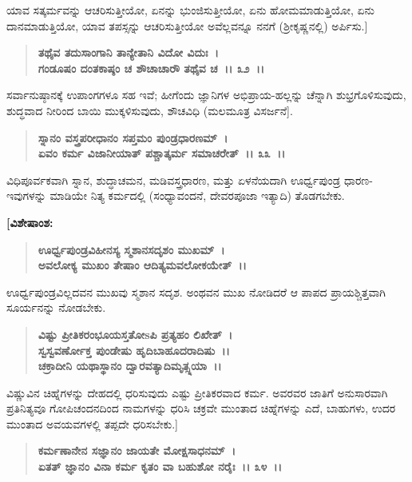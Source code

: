 ಯಾವ ಸತ್ಕರ್ಮವನ್ನು ಆಚರಿಸುತ್ತೀಯೋ, ಏನನ್ನು ಭುಂಜಿಸುತ್ತೀಯೋ, ಏನು ಹೋಮಮಾಡುತ್ತಿಯೋ, ಏನು ದಾನಮಾಡುತ್ತಿಯೋ, ಯಾವ ತಪಸ್ಸನ್ನು ಆಚರಿಸುತ್ತೀಯೋ ಅವೆಲ್ಲವನ್ನೂ ನನಗೆ (ಶ‍್ರೀಕೃಷ್ಣನಲ್ಲಿ) ಅರ್ಪಿಸು.]

\begin{verse}
\textbf{ತಥೈವ ತದುಸಾಂಗಾನಿ ತಾನ್ಯೇತಾನಿ ವಿದೋ ವಿದುಃ~।}\\\textbf{ಗಂಡೂಷಂ ದಂತಕಾಷ್ಠಂ ಚ ಶೌಚಾಚಾರೌ ತಥೈವ ಚ~।। ೩೨~।।}
\end{verse}

ಸರ್ವಾನುಷ್ಠಾನಕ್ಕೆ ಉಪಾಂಗಗಳೂ ಸಹ ಇವೆ; ಹೀಗೆಂದು ಜ್ಞಾನಿಗಳ ಅಭಿಪ್ರಾಯ-\-ಹಲ್ಲನ್ನು ಚೆನ್ನಾಗಿ ಶುಭ್ರಗೊಳಿಸುವುದು, ಶುದ್ಧವಾದ ನೀರಿಂದ ಬಾಯಿ ಮುಕ್ಕಳಿಸುವುದು, ಶೌಚವಿಧಿ (ಮಲಮೂತ್ರ ವಿಸರ್ಜನೆ].

\begin{verse}
\textbf{ಸ್ನಾನಂ ವಸ್ತ್ರಪರೀಧಾನಂ ಸಪ್ತಮಂ ಪುಂಡ್ರಧಾರಣಮ್~।}\\\textbf{ಏವಂ ಕರ್ಮ ವಿಜಾನೀಯಾತ್ ಪಶ್ಚಾತ್ಕರ್ಮ ಸಮಾಚರೇತ್~।। ೩೩~।।}
\end{verse}

ವಿಧಿಪೂರ್ವಕವಾಗಿ ಸ್ನಾನ, ಶುದ್ಧಾಚಮನ, ಮಡಿವಸ್ತ್ರಧಾರಣ, ಮತ್ತು ಏಳನೆಯದಾಗಿ ಊರ್ಧ್ವಪುಂಡ್ರ ಧಾರಣ-ಇವುಗಳನ್ನು ಮಾಡಿಯೇ ನಿತ್ಯ ಕರ್ಮದಲ್ಲಿ (ಸಂಧ್ಯಾವಂದನೆ, ದೇವರ\-ಪೂಜಾ ಇತ್ಯಾದಿ) ತೊಡಗಬೇಕು.

\begin{flushleft}
\textbf{[ವಿಶೇಷಾಂಶ:}
\end{flushleft}

\begin{verse}
\textbf{ಊರ್ಧ್ವಪುಂಡ್ರವಿಹೀನಸ್ಯ ಸ್ಮಶಾನಸದೃಶಂ ಮುಖಮ್~।}\\\textbf{ಅವಲೋಕ್ಯ ಮುಖಂ ತೇಷಾಂ ಆದಿತ್ಯಮವಲೋಕಯೇತ್~।।}
\end{verse}

ಊರ್ಧ್ವಪುಂಡ್ರವಿಲ್ಲದವನ ಮುಖವು ಸ್ಮಶಾನ ಸದೃಶ. ಅಂಥವನ ಮುಖ ನೋಡಿದರೆ ಆ ಪಾಪದ ಪ್ರಾಯಶ್ಚಿತ್ತವಾಗಿ ಸೂರ್ಯನನ್ನು ನೋಡಬೇಕು.

\begin{verse}
\textbf{ವಿಷ್ಟು ಪ್ರೀತಿಕರಂಭೂಯಸ್ತತೋsಪಿ ಪ್ರತ್ಯಹಂ ಲಿಖೇತ್~।}\\\textbf{ಸ್ವಸ್ವವರ್ಣೋಕ್ತ ಪುಂಡೇಷು ಹೃದಿಬಾಹೂದರಾದಿಷು~।। }\\\textbf{ಚಕ್ರಾದೀನಿ ಯಥಾಸ್ಥಾನಂ ದ್ವಾರವತ್ಯಾದಿಮೃತ್ಸ್ನಯಾ~।।} 
\end{verse}

ವಿಷ್ಣುವಿನ ಚಿಹ್ನೆಗಳನ್ನು ದೇಹದಲ್ಲಿ ಧರಿಸುವುದು ಎಷ್ಟು ಪ್ರೀತಿಕರವಾದ ಕರ್ಮ. ಅವರವರ ಜಾತಿಗೆ ಅನುಸಾರವಾಗಿ ಪ್ರತಿನಿತ್ಯವೂ ಗೋಪಿಚಂದನದಿಂದ ನಾಮಗಳನ್ನು ಧರಿಸಿ ಚಕ್ರವೇ ಮುಂತಾದ ಚಿಹ್ನೆಗಳನ್ನು ಎದೆ, ಬಾಹುಗಳು, ಉದರ ಮುಂತಾದ ಅವಯವಗಳಲ್ಲಿ ತಪ್ಪದೇ ಧರಿಸಬೇಕು.]

\begin{verse}
\textbf{ಕರ್ಮಣಾನೇನ ಸಜ್ಞಾನಂ ಜಾಯತೇ ಮೋಕ್ಷಸಾಧನಮ್~।}\\\textbf{ಏತತ್ ಜ್ಞಾನಂ ವಿನಾ ಕರ್ಮ ಕೃತಂ ವಾ ಬಹುಶೋ ನರೈಃ~।। ೩೪~।। }
\end{verse}

